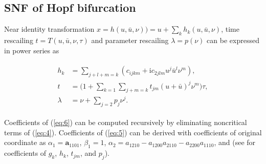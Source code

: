 \documentclass[openacc]{rsproca_new}%
\def\vec#1{\ensuremath{\mathbf{#1}}}
\newcommand{\Eref}[1]{(\ref{#1})}
\begin{document}
\begin{appendices}
\gdef\thesection{Appendix \Alph{section}}

\section{SNF of Hopf bifurcation} \label{ap0}
Near identity transformation
\(x=h(u,\bar{u},\nu))=u+\sum_k h_k(u,\bar{u},\nu)\), time rescailing \(t=T(u,\bar{u},\nu,\tau)\) and parameter rescailing \(\lambda=p(\nu)\) can be expressed in power series as

\begin{align}\label{eq:6}
  \begin{split}
    h_k &=\sum_{j+l+m=k}(c_{ijkm}+\textrm{i}c_{2jlm}u^j\bar{u}^l \nu^m),\\
    t &=\Big(1+\sum_{k=1}\sum_{j+m=k}t_{jm}(u+\bar{u})^j\nu^m\Big)\tau,\\
    \lambda &=\nu+\sum_{j=2}p_j \nu^j.
  \end{split}
\end{align}

\noindent Coefficients of \Eref{eq:6} can be computed recursively \cite{yu2002simplest} by eliminating noncritical terms of \Eref{eq:4}. Coefficients of \Eref{eq:5} can be derived with coefficients of original coordinate as $\alpha_1=\vec{a}_{1101}$, $\beta_1=1$, $\alpha_2=a_{1210}-a_{1200}a_{2110}-a_{2200}a_{1110}$, and  (see \cite{yu2002simplest} for coefficients of $g_k$, $h_k$, $t_{jm}$, and $p_j$).

\end{appendices}




\end{document}
